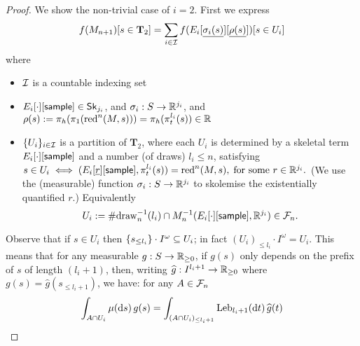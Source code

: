 \begin{proof}
We show the non-trivial case of $i = 2$.
First we express 
\begin{equation}
f(M_{n+1})[s \in \mathbf{T}_2] = \sum_{i \in \calI} 
f(E_i[\underline{\sigma_i(s)}][\underline{\rho(s)}])[s \in U_i]
\label{eqn:f 2 n+1}
\end{equation}
where 
\begin{itemize}
\item $\mathcal{I}$ is a countable indexing set
\item $E_i[\cdot][\mathsf{sample}] \in \mathsf{Sk}_{j_i}$, and $\sigma_i : S \to \mathbb{R}^{j_i}$, and $\rho(s) := \pi_h(\pi_1(\operatorname{red}^n(M, s))) = \pi_h(\pi_t^{l_i}(s)) \in \mathbb{R}$ 
\item $\{U_i\}_{i \in \mathcal{I}}$ is a partition of $\mathbf{T}_2$, 
where each $U_i$ is determined by a skeletal term $E_i[\cdot][\mathsf{sample}]$ and a number (of draws) $l_i \leq n$, satisfying
\(
s \in U_i
\iff
(E_i[\underline{r}][{\mathsf{sample}}], \pi_t^{l_i}(s)) = \operatorname{red}^n(M, s),
\;
\hbox{for some }r \in \mathbb{R}^{j_i}.
\)
(We use the (measurable) function $\sigma_i : S \to \mathbb{R}^{j_i}$ to skolemise the existentially quantified $r$.)
Equivalently
\[
U_i := \#\mathrm{draw}_n^{-1}(l_i) \cap M_n^{-1}(E_i[\cdot][\mathsf{sample}], \mathbb{R}^{j_i}) \in \mathcal{F}_n.
\]
\end{itemize}

Observe that if $s \in U_i$ then $\{s_{\leq l_i}\} \cdot I^\omega \subseteq U_i$;
in fact $(U_i)_{\leq l_i} \cdot I^\omega = U_i$.
This means that for any measurable $g : S \to \mathbb{R}_{\geq 0}$, if $g(s)$ only depends on the prefix of $s$ of length $(l_i+1)$, then, writing $\widehat{g} : I^{l_i+1} \to \mathbb{R}_{\geq 0}$ where $g(s) = \widehat{g}(s_{\leq l_i+1})$, we have: for any $A \in \mathcal{F}_n$ 
\begin{equation}
\int_{A \cap U_i}  \mu(\dif s) \, g(s) = 
\int_{(A \cap U_i)_{\leq l_i+1}} \Leb_{l_i+1}(\dif t) \, \widehat{g}(t)
\label{eqn:truncate}
\end{equation}


\end{proof}
